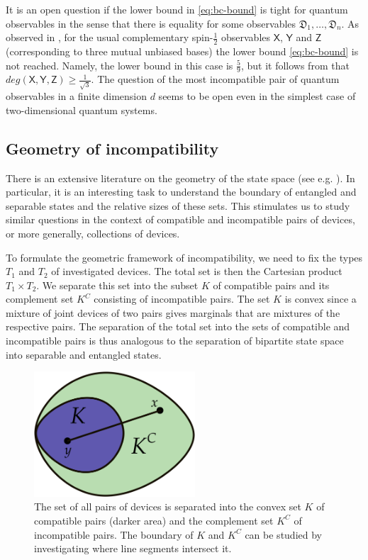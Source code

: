 \documentclass[12pt]{iopart}
\theoremstyle{definition}
\newcommand{\half}{\tfrac{1}{2}} %
\newcommand{\Dev}{\mathfrak{D}} %
\begin{document}
It is an open question if the lower bound in \eqref{eq:bc-bound} is tight for quantum observables in the sense that there is equality for some observables $\Dev_1,\ldots,\Dev_n$. 
As observed in \cite{DaMaSa01}, for the usual complementary spin-$\half$ observables $\mathsf{X}$, $\mathsf{Y}$ and $\mathsf{Z}$ (corresponding to three mutual unbiased bases) the lower bound \eqref{eq:bc-bound} is not reached.
Namely, the lower bound in this case is $\frac{5}{9}$, but it follows from \cite{Busch86} that
$deg(\mathsf{X},\mathsf{Y},\mathsf{Z}) \geq \frac{1}{\sqrt{3}}$. 
The question of the most incompatible pair of quantum observables in a finite dimension $d$ seems to be open even in the simplest case of two-dimensional quantum systems.

\subsection{Geometry of incompatibility}

There is an extensive literature on the geometry of the state space (see e.g. \cite{GQS06}).
In particular, it is an interesting task to understand the boundary of entangled and separable states and the relative sizes of these sets.
This stimulates us to study similar questions in the context of compatible and incompatible pairs of devices, or more generally, collections of devices.

To formulate the geometric framework of incompatibility, we need to fix the types $T_1$ and $T_2$ of investigated devices.
The total set is then the Cartesian product $T_1\times T_2$.
We separate this set into the subset $K$ of compatible pairs and its complement set $K^C$ consisting of incompatible pairs.
The set $K$ is convex since a mixture of joint devices of two pairs gives marginals that are mixtures of the respective pairs. 
The separation of the total set into the sets of compatible and incompatible pairs is thus analogous to the separation of bipartite state space into separable and entangled states.

\begin{figure}\begin{center}
\includegraphics[width=6cm]{fig_geometry.png}
\caption{The set of all pairs of devices is separated into the convex set $K$ of compatible pairs (darker area) and the complement set $K^C$ of incompatible pairs.
The boundary of $K$ and $K^C$ can be studied by investigating where line segments intersect it.}
\label{fig:geometry}
\end{center}
\end{figure}
\end{document}
